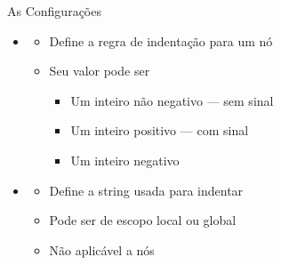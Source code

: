 \documentclass
  [ aspectratio=169,
    english,
    hyperref={citecolor=blue,colorlinks=true,linkcolor=blue,urlcolor=blue},
    brazil]
  {beamer}
\begin{document}

  \begin{frame}[fragile]{As Configurações}
    \begin{itemize}
      \item {}
            \begin{itemize}
              \item Define a regra de indentação para um nó
              \item Seu valor pode ser
                    \begin{itemize}
                      \item Um inteiro não negativo --- sem sinal
                      \item Um inteiro positivo --- com sinal
                      \item Um inteiro negativo
                    \end{itemize}
            \end{itemize}
      \item {}
            \begin{itemize}
              \item Define a string usada para indentar
              \item Pode ser de escopo local ou global
              \item Não aplicável a nós
            \end{itemize}
    \end{itemize}
  \end{frame}


\end{document}
